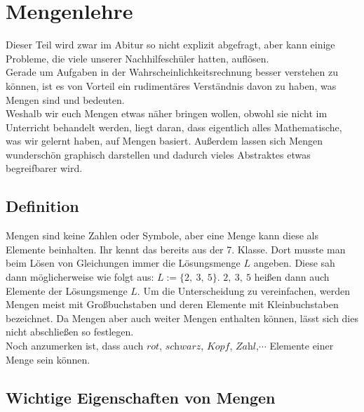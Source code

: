 \section{Mengenlehre}
	Dieser Teil wird zwar im Abitur so nicht explizit abgefragt, aber kann einige
	Probleme, die viele unserer Nachhilfeschüler hatten, auflösen.\\
	Gerade um Aufgaben in der Wahrscheinlichkeitsrechnung besser verstehen zu
	können, ist es von Vorteil ein rudimentäres Verständnis davon zu haben, was
	Mengen sind und bedeuten.\\
	Weshalb wir euch Mengen etwas näher bringen wollen, obwohl sie nicht im
	Unterricht behandelt werden, liegt daran, dass eigentlich alles Mathematische,
	was wir gelernt haben, auf Mengen basiert. Außerdem lassen sich Mengen
	wunderschön graphisch darstellen und dadurch vieles Abstraktes etwas
	begreifbarer wird.

	\subsection{Definition}
		Mengen sind keine Zahlen oder Symbole, aber eine Menge kann diese als Elemente
		beinhalten. Ihr kennt das bereits aus der 7. Klasse. Dort musste man beim
		Lösen von Gleichungen immer die Lösungsmenge $L$ angeben. Diese sah dann
		möglicherweise wie folgt aus: $L:=\{2,\ 3,\ 5\}$. $2,\ 3,\ 5$ heißen dann auch
		Elemente der Lösungsmenge $L$. Um die Unterscheidung zu vereinfachen, werden
		Mengen meist mit Großbuchstaben und deren Elemente mit Kleinbuchstaben
		bezeichnet. Da Mengen aber auch weiter Mengen enthalten können, lässt sich
		dies nicht abschließen so festlegen.\\
		Noch anzumerken ist, dass auch $\textit{rot}$, $\textit{schwarz}$,
		$\textit{Kopf}$, $\textit{Zahl}$,$\cdots$ Elemente einer Menge sein können.\\

	\subsection{Wichtige Eigenschaften von Mengen}
	
